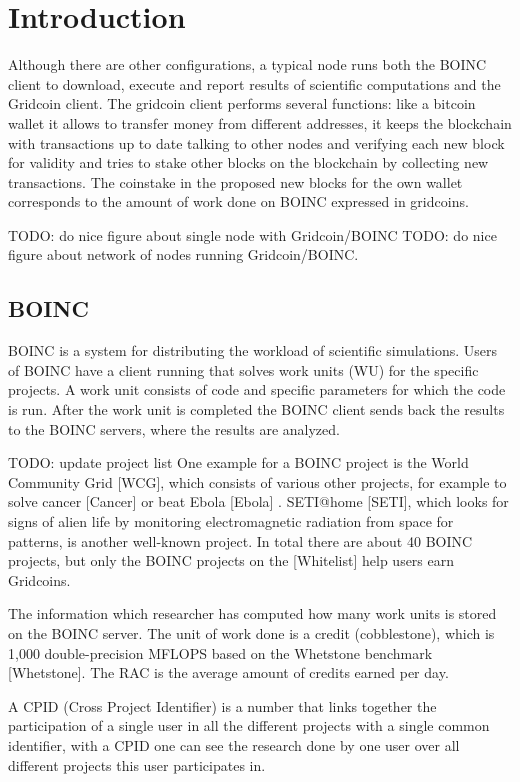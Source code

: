 \section{Introduction}
\label{sec:intro}

Although there are other configurations, a typical node runs both the BOINC client to download, execute and report results of scientific computations and the Gridcoin client. The gridcoin client performs several functions: like a bitcoin wallet it allows to transfer money from different addresses, it keeps the blockchain with transactions up to date talking to other nodes and verifying each new block for validity and tries to stake other blocks on the blockchain by collecting new transactions. The coinstake in the proposed new blocks for the own wallet corresponds to the amount of work done on BOINC expressed in gridcoins.

TODO: do nice figure about single node with Gridcoin/BOINC
TODO: do nice figure about network of nodes running Gridcoin/BOINC.

\subsection{BOINC}

BOINC is a system for distributing the workload of scientific simulations. Users of BOINC have a client running that solves work units (WU) for the specific projects. A work unit consists of code and specific parameters for which the code is run.  After the work unit is completed the BOINC client sends back the results to the BOINC servers, where the results are analyzed.

TODO: update project list
One example for a BOINC project is the World Community Grid [WCG], which consists of various other projects, for example to solve cancer [Cancer] or beat Ebola [Ebola] . SETI@home [SETI], which looks for signs of alien life by monitoring electromagnetic radiation from space for patterns, is another well-known project.  In total there are about 40 BOINC projects, but only the BOINC projects on the [Whitelist] help users earn Gridcoins.

The information which researcher has computed how many work units is stored on the BOINC server. The unit of work done is a credit (cobblestone), which is 1,000 double-precision MFLOPS based on the Whetstone benchmark [Whetstone].  The RAC is the average amount of credits earned  per day.

A CPID (Cross Project Identifier) is a number that links together the participation of a single user in all the different projects with a single common identifier, with a CPID one can see the research done by one user over all different projects this user participates in.

